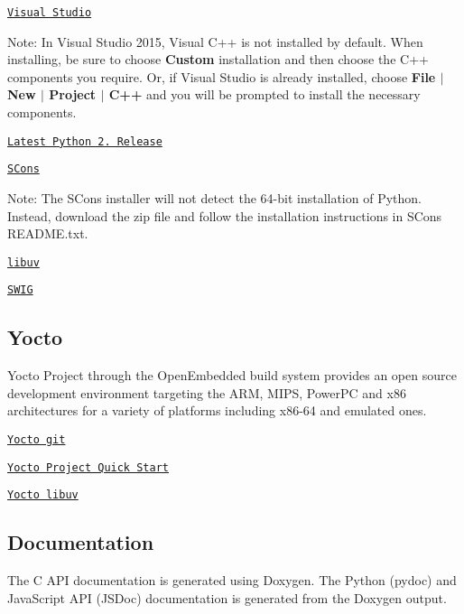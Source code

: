 \begin{DoxyItemize}
\item \href{https://www.visualstudio.com/downloads/}{\tt Visual Studio}

Note\+: In Visual Studio 2015, Visual C++ is not installed by default. When installing, be sure to choose {\bfseries Custom} installation and then choose the C++ components you require. Or, if Visual Studio is already installed, choose {\bfseries File $\vert$ New $\vert$ Project $\vert$ C++} and you will be prompted to install the necessary components.
\item \href{https://www.python.org/downloads/windows/}{\tt Latest Python 2. Release}
\item \href{http://scons.org/pages/download.html}{\tt S\+Cons}

Note\+: The S\+Cons installer will not detect the 64-\/bit installation of Python. Instead, download the zip file and follow the installation instructions in S\+Cons R\+E\+A\+D\+M\+E.\+txt.
\item \href{http://dist.libuv.org/dist/}{\tt libuv}
\item \href{http://www.swig.org/download.html}{\tt S\+W\+IG}
\end{DoxyItemize}\hypertarget{building-and-running_prerequisites-yocto}{}\subsection{Yocto}\label{building-and-running_prerequisites-yocto}
Yocto Project through the Open\+Embedded build system provides an open source development environment targeting the A\+RM, M\+I\+PS, Power\+PC and x86 architectures for a variety of platforms including x86-\/64 and emulated ones.


\begin{DoxyItemize}
\item \href{https://git.yoctoproject.org/}{\tt Yocto git}
\item \href{http://www.yoctoproject.org/docs/1.8/yocto-project-qs/yocto-project-qs.html}{\tt Yocto Project Quick Start}
\item \href{https://layers.openembedded.org/layerindex/recipe/32082/}{\tt Yocto libuv}
\end{DoxyItemize}\hypertarget{building-and-running_prerequisites-documentation}{}\subsection{Documentation}\label{building-and-running_prerequisites-documentation}
The C A\+PI documentation is generated using Doxygen. The Python (pydoc) and Java\+Script A\+PI (J\+S\+Doc) documentation is generated from the Doxygen output.

